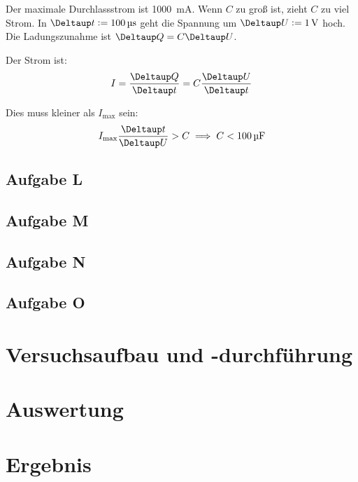Der maximale Durchlassstrom ist \SI{1000}{\milli\ampere}. Wenn $C$ zu groß ist, zieht $C$ zu viel Strom. In $\Deltaup t := \SI{100}{\micro\second}$ geht die Spannung um $\Deltaup U := \SI1\volt$ hoch. Die Ladungszunahme ist $\Deltaup Q = C \Deltaup U$.

Der Strom ist:
\[
	I = \frac{\Deltaup Q}{\Deltaup t}
	= C \frac{\Deltaup U}{\Deltaup t}
\]

Dies muss kleiner als $I_\text{max}$ sein:
\[
	I_\text{max} \frac{\Deltaup t}{\Deltaup U} > C
	\implies
	C < \SI{100}{\micro\farad}
\]

\subsection{Aufgabe L}

\fehlt

\subsection{Aufgabe M}

\fehlt

\subsection{Aufgabe N}

\fehlt

\subsection{Aufgabe O}

\fehlt


\section{Versuchsaufbau und -durchführung}


\section{Auswertung}


\section{Ergebnis}

\IfFileExists{\bibliographyfile}{
	
}{}



